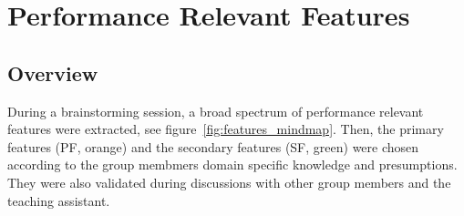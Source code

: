 \documentclass[milestone1.tex]{subfiles}
\begin{document}
\section{Performance Relevant Features}
\subsection{Overview}

During a brainstorming session, a broad spectrum of performance relevant features were extracted, see figure~\ref{fig:features_mindmap}. Then, the primary features (PF, orange) and the secondary features (SF, green) were chosen according to the group membmers domain specific knowledge and presumptions. They were also validated during discussions with other group members and the teaching assistant.


    
\end{document}
